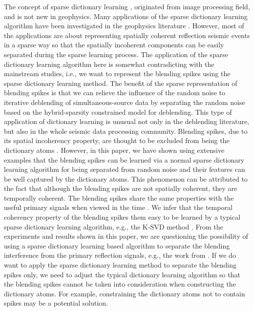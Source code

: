 The concept of sparse dictionary learning \cite[]{mairal2009online}, originated from image processing field,  and is not new in geophysics. Many applications of the sparse dictionary learning algorithm have been investigated in the geophysics literature \cite[]{jianwei20142,yangkang2016dsd,amir2017geo,amir2017}. However, most of the applications are about representing spatially coherent reflection seismic events in a sparse way so that the spatially incoherent components can be easily separated during the sparse learning process. The application of the sparse dictionary learning algorithm here is somewhat contradicting with the mainstream studies, i.e., we want to represent the blending spikes using the sparse dictionary learning method. The benefit of the sparse representation of blending spikes is that we can relieve the influence of the random noise to iterative deblending of simultaneous-source data by separating the random noise based on the hybrid-sparsity constrained model for deblending. This type of application of dictionary learning is unusual not only in the deblending literature, but also in the whole seismic data processing community. Blending spikes, due to its spatial incoherency property, are thought to be excluded from being  the dictionary atoms \cite[]{yanhui2014,yanhui2016}. However, in this paper, we have shown using extensive examples that the blending spikes can be learned via a normal sparse dictionary learning algorithm for being separated from random noise and their features can be well captured by the dictionary atoms. This phenomenon can be attributed to the fact that although the blending spikes are not spatially coherent, they are temporally coherent. The blending spikes share the same properties with the useful primary signals when viewed in the time . We infer that the temporal coherency property of the blending spikes  them easy to be learned by a typical sparse dictionary learning algorithm, e.g., the K-SVD method \cite[]{aksvd2008}. From the experiments and results shown in this paper, we are questioning the possibility of using a sparse dictionary learning based algorithm to separate the blending interference from the primary reflection signals, e.g., the work from \cite{yanhui2014}. If we do want to apply the sparse dictionary learning method to separate the blending spikes only, we need to adjust the typical dictionary learning algorithm so that the blending spikes cannot be taken into consideration when constructing the dictionary atoms. For example, constraining the dictionary atoms not to contain spikes may be a potential solution.

